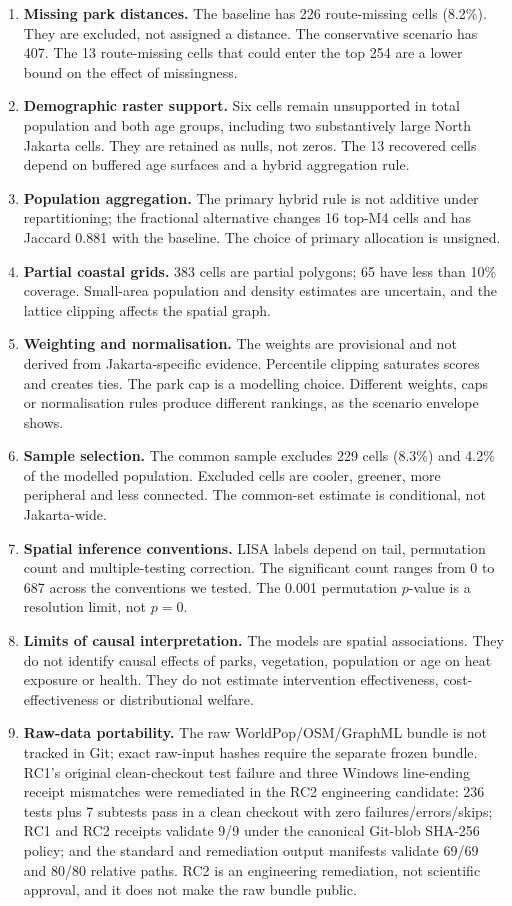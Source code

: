 \documentclass[times,twoside]{_Templates/MultiTargetManuscript}
\begin{document}
\begin{enumerate}
crossings, security gates, flooding or construction. Shortest-path distance is
not the same as walkability or perceived access.
\item \textbf{Missing park distances.} The baseline has 226 route-missing cells
(8.2\%). They are excluded, not assigned a distance. The conservative scenario
has 407. The 13 route-missing cells that could enter the top 254 are a lower
bound on the effect of missingness.
\item \textbf{Demographic raster support.} Six cells remain unsupported in total
population and both age groups, including two substantively large North Jakarta
cells. They are retained as nulls, not zeros. The 13 recovered cells depend on
buffered age surfaces and a hybrid aggregation rule.
\item \textbf{Population aggregation.} The primary hybrid rule is not additive
under repartitioning; the fractional alternative changes 16 top-M4 cells and has
Jaccard 0.881 with the baseline. The choice of primary allocation is unsigned.
\item \textbf{Partial coastal grids.} 383 cells are partial polygons; 65 have
less than 10\% coverage. Small-area population and density estimates are
uncertain, and the lattice clipping affects the spatial graph.
\item \textbf{Weighting and normalisation.} The weights are provisional and not
derived from Jakarta-specific evidence. Percentile clipping saturates scores and
creates ties. The park cap is a modelling choice. Different weights, caps or
normalisation rules produce different rankings, as the scenario envelope shows.
\item \textbf{Sample selection.} The common sample excludes 229 cells (8.3\%)
and 4.2\% of the modelled population. Excluded cells are cooler, greener, more
peripheral and less connected. The common-set estimate is conditional, not
Jakarta-wide.
\item \textbf{Spatial inference conventions.} LISA labels depend on tail,
permutation count and multiple-testing correction. The significant count ranges
from 0 to 687 across the conventions we tested. The 0.001 permutation $p$-value
is a resolution limit, not $p=0$.
\item \textbf{Limits of causal interpretation.} The models are spatial
associations. They do not identify causal effects of parks, vegetation,
population or age on heat exposure or health. They do not estimate intervention
effectiveness, cost-effectiveness or distributional welfare.
\item \textbf{Raw-data portability.} The raw WorldPop/OSM/GraphML bundle is not
tracked in Git; exact raw-input hashes require the separate frozen bundle. RC1's
original clean-checkout test failure and three Windows line-ending receipt
mismatches were remediated in the RC2 engineering candidate: 236 tests plus 7
subtests pass in a clean checkout with zero failures/errors/skips; RC1 and RC2
receipts validate 9/9 under the canonical Git-blob SHA-256 policy; and the
standard and remediation output manifests validate 69/69 and 80/80 relative
paths. RC2 is an engineering remediation, not scientific approval, and it does
not make the raw bundle public.
\end{enumerate}
\end{document}
